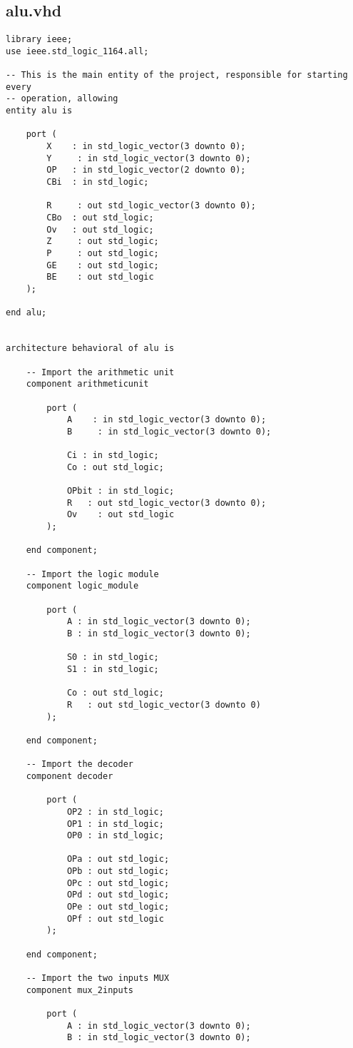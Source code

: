 \subsection{alu.vhd}
\begin{lstlisting}
library ieee;
use ieee.std_logic_1164.all;

-- This is the main entity of the project, responsible for starting every 
-- operation, allowing 
entity alu is

	port (
		X    : in std_logic_vector(3 downto 0);
		Y	  : in std_logic_vector(3 downto 0);
		OP   : in std_logic_vector(2 downto 0);
		CBi  : in std_logic;
		
		R 	  : out std_logic_vector(3 downto 0);
		CBo  : out std_logic;
		Ov   : out std_logic;
		Z 	  : out std_logic;
		P 	  : out std_logic;
		GE	  : out std_logic;
		BE	  : out std_logic
	);
	
end alu;


architecture behavioral of alu is

	-- Import the arithmetic unit 
	component arithmeticunit
	
		port (
			A    : in std_logic_vector(3 downto 0);
			B 	  : in std_logic_vector(3 downto 0);
		
			Ci : in std_logic;
			Co : out std_logic;
			
			OPbit : in std_logic;
			R  	: out std_logic_vector(3 downto 0);
			Ov    : out std_logic
		);
		
	end component;
	
	-- Import the logic module
	component logic_module
		
		port (
			A : in std_logic_vector(3 downto 0);
			B : in std_logic_vector(3 downto 0);
			
			S0 : in std_logic;
			S1 : in std_logic;
			
			Co : out std_logic;
			R 	: out std_logic_vector(3 downto 0)
		);
	
	end component;
	
	-- Import the decoder
	component decoder
	
		port (
			OP2 : in std_logic;
			OP1 : in std_logic;
			OP0 : in std_logic;
			
			OPa : out std_logic;
			OPb : out std_logic;
			OPc : out std_logic;
			OPd : out std_logic;
			OPe : out std_logic;
			OPf : out std_logic
		);
		
	end component;
	
	-- Import the two inputs MUX
	component mux_2inputs
	
		port (
			A : in std_logic_vector(3 downto 0);
			B : in std_logic_vector(3 downto 0); 


\end{lstlisting}
